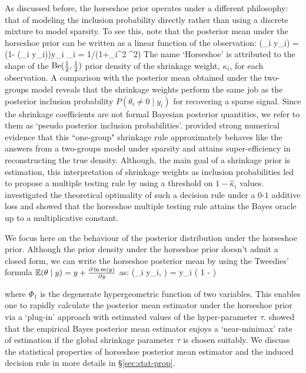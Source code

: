 \documentclass[11pt]{article}
\begin{document}
As discussed before, the horseshoe prior operates under a different philosophy: that of modeling the inclusion probability directly rather than using a discrete mixture to model sparsity. To see this, note that the posterior mean under the horseshoe prior can be written as a linear function of the observation:
\beq
\E(\theta_i \mid y_i) = (1- \E(\kappa_i \mid y_i))y_i  \kappa_i = 1/(1+\lambda_i^2 \tau^2)
\eeq
The name `Horseshoe' is attributed to the shape of the ${\rm Be} (\frac{1}{2},
\frac{1}{2})$ prior density of the shrinkage weight, $\kappa_i$, for each
observation. A comparison with the posterior mean obtained under the two-groups
model reveals that the shrinkage weights perform the same job as the posterior
inclusion probability $P(\theta_i \ne 0 \mid y_i)$ for recovering a sparse
signal. Since the shrinkage coefficients are not formal Bayesian posterior
quantities, we refer to them as `pseudo posterior inclusion probabilities'.
\citet{carvalho2010horseshoe} provided strong numerical evidence that this
``one-group" shrinkage rule approximately behaves like the answers from a
two-groups model under sparsity and attains super-efficiency in reconstructing
the true density. Although, the main goal of a shrinkage prior is estimation,
this interpretation of shrinkage weights as inclusion probabilities led
\citet{carvalho2010horseshoe} to propose a multiple testing rule by using a
threshold on $1-\hat{\kappa}_i$ values. \citet{datta2013asymptotic}
investigated the theoretical optimality of such a decision rule under a $0$-$1$
additive loss and showed that the horseshoe multiple testing rule attains the
Bayes oracle up to a multiplicative constant. 

We focus here on the behaviour of the posterior distribution under the
horseshoe prior. Although the prior density under the horseshoe prior doesn't
admit a closed form, we can write the horseshoe posterior mean by using the
Tweedies' formula $\mathbb E(\theta \mid y) = y + \frac{\partial \ln m(y)}{\partial y}$ as: 
\beq
\E(\theta_i \mid y_i, \tau) = y_i \left( 1 -  \right)
\eeq

where $\Phi_1$ is the degenerate hypergeometric function of two variables. This enables one to rapidly calculate the posterior mean estimator under the horseshoe prior via a `plug-in' approach with estimated values of the hyper-parameter $\tau$. \citet{van2014horseshoe} showed that the empirical Bayes posterior mean estimator enjoys  a `near-minimax' rate of estimation if the global shrinkage parameter $\tau$ is chosen suitably. We discuss the statistical properties of horseshoe posterior mean estimator and the induced decision rule in more details in \S \ref{sec:stat-prop}. 
\end{document}
